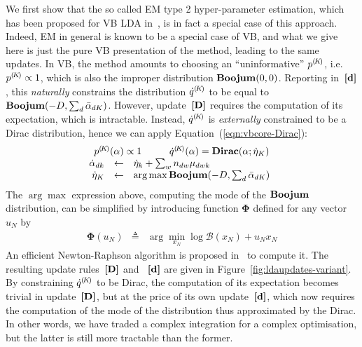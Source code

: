 We first show that the so called EM type 2 hyper-parameter estimation, which has been proposed for VB LDA in~\cite{blei_latent_2003}, is in fact a special case of this approach. Indeed, EM in general is known to be a special case of VB, and what we give here is just the pure VB presentation of the method, leading to the same updates. In VB, the method amounts to choosing an ``uninformative'' ${p}^{(\!{K}\!)}$, i.e. ${p}^{(\!{K}\!)}\propto1$, which is also the improper distribution $\mathbf{Boojum}(0,0)$. Reporting in~$\textbf{[d]}$, this {\em naturally} constrains the distribution ${\dot{q}}^{(\!{K}\!)}$ to be equal to $\mathbf{Boojum}(-D,\sum_d\bar{\alpha}_{dK})$. However, update~$\textbf{[D]}$ requires the computation of its expectation, which is intractable. Instead, ${\dot{q}}^{(\!{K}\!)}$ is {\em externally} constrained to be a Dirac distribution, hence we can apply Equation~(\ref{eqn:vbcore-Dirac}):
\[
\begin{array}{rcl}
\multicolumn{3}{c}{
\begin{array}{c@{\hspace{1cm}}c}
\cpnt{p}{K}(\vmK)\propto1 &
\cpnt{\dot{q}}{K}(\vmK) = \mathbf{Dirac}(\vmK;\vvmK_K)
\end{array}
}\\
\vvmDK_{dk} & \assignn & \vvmK_k+\sum_wn_{dw}\vvmDWK_{dwk} \\
\vvmK_K & \assignn & \arg\max\mbeta(-D,\sum_d\vvmbDK_{dK})
\end{array}
\]
The $\arg\max$ expression above, computing the mode of the $\mathbf{Boojum}$ distribution, can be simplified by introducing function $\boldsymbol{\Phi}$ defined for any vector $u_N$ by
\begin{eqnarray*}
\boldsymbol{\Phi}(u_N) & \triangleq & \arg\min_{x_N}\log\mathcal{B}(x_N)+u_Nx_N
\end{eqnarray*}
An efficient Newton-Raphson algorithm is proposed in~\cite{blei_latent_2003} to compute it. The resulting update rules~$\textbf{[D]}$ and ~$\textbf{[d]}$ are given in Figure~\ref{fig:ldaupdates-variant}. By constraining ${\dot{q}}^{(\!{K}\!)}$ to be Dirac, the computation of its expectation becomes trivial in update~$\textbf{[D]}$, but at the price of its own update~$\textbf{[d]}$, which now requires the computation of the mode of the distribution thus approximated by the Dirac. In other words, we have traded a complex integration for a complex optimisation, but the latter is still more tractable than the former.

